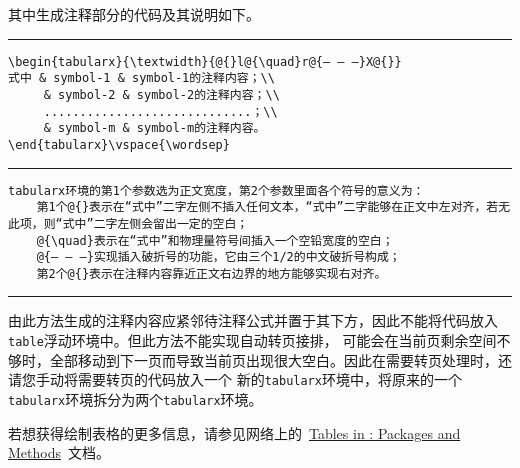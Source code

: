 其中生成注释部分的代码及其说明如下。
\vspace{1em}\noindent\hrule
\begin{lstlisting}
\begin{tabularx}{\textwidth}{@{}l@{\quad}r@{— — —}X@{}}
式中 & symbol-1 & symbol-1的注释内容；\\
     & symbol-2 & symbol-2的注释内容；\\
     .............................；\\
     & symbol-m & symbol-m的注释内容。
\end{tabularx}\vspace{\wordsep}
\end{lstlisting}
\noindent\hrule
\begin{lstlisting}
tabularx环境的第1个参数选为正文宽度，第2个参数里面各个符号的意义为：
    第1个@{}表示在“式中”二字左侧不插入任何文本，“式中”二字能够在正文中左对齐，若无此项，则“式中”二字左侧会留出一定的空白；
    @{\quad}表示在“式中”和物理量符号间插入一个空铅宽度的空白；
    @{— — —}实现插入破折号的功能，它由三个1/2的中文破折号构成；
    第2个@{}表示在注释内容靠近正文右边界的地方能够实现右对齐。
\end{lstlisting}
\noindent\hrule\vspace{1em}
由此方法生成的注释内容应紧邻待注释公式并置于其下方，因此不能将代码放入\verb|table|浮动环境中。但此方法不能实现自动转页接排，
可能会在当前页剩余空间不够时，全部移动到下一页而导致当前页出现很大空白。因此在需要转页处理时，还请您手动将需要转页的代码放入一个
新的\verb|tabularx|环境中，将原来的一个\verb|tabularx|环境拆分为两个\verb|tabularx|环境。

若想获得绘制表格的更多信息，请参见网络上的~\href{http://www.tug.org/pracjourn/2007-1/mori/}{Tables in \LaTeXe: Packages and Methods}~文档。
